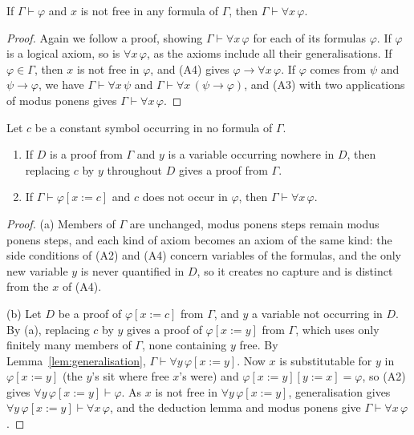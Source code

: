 \begin{lemma}[generalisation]\label{lem:generalisation}
If $\Gamma\vdash\varphi$ and $x$ is not free in any formula of $\Gamma$, then $\Gamma\vdash\forall x\,\varphi$.
\end{lemma}

\begin{proof}
Again we follow a proof, showing $\Gamma\vdash\forall x\,\varphi$ for each of its formulas $\varphi$. If $\varphi$ is a logical axiom, so is $\forall x\,\varphi$, as the axioms include all their generalisations. If $\varphi\in\Gamma$, then $x$ is not free in $\varphi$, and (A4) gives $\varphi\to\forall x\,\varphi$. If $\varphi$ comes from $\psi$ and $\psi\to\varphi$, we have $\Gamma\vdash\forall x\,\psi$ and $\Gamma\vdash\forall x\,(\psi\to\varphi)$, and (A3) with two applications of modus ponens gives $\Gamma\vdash\forall x\,\varphi$.
\end{proof}

\begin{lemma}[constants]\label{lem:constants}
Let $c$ be a constant symbol occurring in no formula of $\Gamma$.
\begin{enumerate}
\item If $D$ is a proof from $\Gamma$ and $y$ is a variable occurring nowhere in $D$, then replacing $c$ by $y$ throughout $D$ gives a proof from $\Gamma$.
\item If $\Gamma\vdash\varphi[x:=c]$ and $c$ does not occur in $\varphi$, then $\Gamma\vdash\forall x\,\varphi$.
\end{enumerate}
\end{lemma}

\begin{proof}
(a) Members of $\Gamma$ are unchanged, modus ponens steps remain modus ponens steps, and each kind of axiom becomes an axiom of the same kind: the side conditions of (A2) and (A4) concern variables of the formulas, and the only new variable $y$ is never quantified in $D$, so it creates no capture and is distinct from the $x$ of (A4).

(b) Let $D$ be a proof of $\varphi[x:=c]$ from $\Gamma$, and $y$ a variable not occurring in $D$. By (a), replacing $c$ by $y$ gives a proof of $\varphi[x:=y]$ from $\Gamma$, which uses only finitely many members of $\Gamma$, none containing $y$ free. By Lemma~\ref{lem:generalisation}, $\Gamma\vdash\forall y\,\varphi[x:=y]$. Now $x$ is substitutable for $y$ in $\varphi[x:=y]$ (the $y$'s sit where free $x$'s were) and $\varphi[x:=y][y:=x]=\varphi$, so (A2) gives $\forall y\,\varphi[x:=y]\vdash\varphi$. As $x$ is not free in $\forall y\,\varphi[x:=y]$, generalisation gives $\forall y\,\varphi[x:=y]\vdash\forall x\,\varphi$, and the deduction lemma and modus ponens give $\Gamma\vdash\forall x\,\varphi$.
\end{proof}

